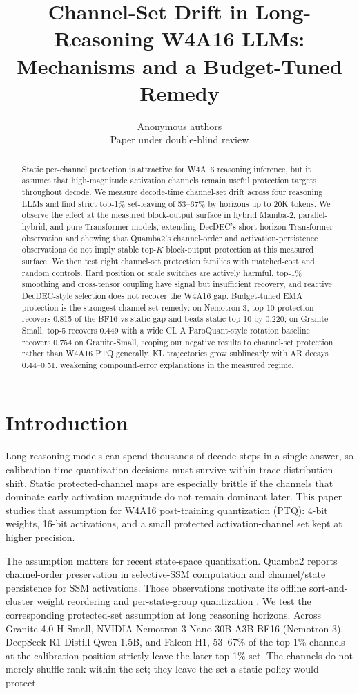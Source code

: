 \documentclass{article}
\title{Channel-Set Drift in Long-Reasoning W4A16 LLMs: Mechanisms and a Budget-Tuned Remedy}
\author{Anonymous authors\\Paper under double-blind review}
\begin{document}
\maketitle

\begin{abstract}
Static per-channel protection is attractive for W4A16 reasoning inference, but it assumes that high-magnitude activation channels remain useful protection targets throughout decode. We measure decode-time channel-set drift across four reasoning LLMs and find strict top-1\% set-leaving of 53--67\% by horizons up to 20K tokens. We observe the effect at the measured block-output surface in hybrid Mamba-2, parallel-hybrid, and pure-Transformer models, extending DecDEC's short-horizon Transformer observation and showing that Quamba2's channel-order and activation-persistence observations do not imply stable top-$K$ block-output protection at this measured surface. We then test eight channel-set protection families with matched-cost and random controls. Hard position or scale switches are actively harmful, top-1\% smoothing and cross-tensor coupling have signal but insufficient recovery, and reactive DecDEC-style selection does not recover the W4A16 gap. Budget-tuned EMA protection is the strongest channel-set remedy: on Nemotron-3, top-10 protection recovers 0.815 of the BF16-vs-static gap and beats static top-10 by 0.220; on Granite-Small, top-5 recovers 0.449 with a wide CI. A ParoQuant-style rotation baseline recovers 0.754 on Granite-Small, scoping our negative results to channel-set protection rather than W4A16 PTQ generally. KL trajectories grow sublinearly with AR decays 0.44--0.51, weakening compound-error explanations in the measured regime.
\end{abstract}

\section{Introduction}

Long-reasoning models can spend thousands of decode steps in a single answer, so calibration-time quantization decisions must survive within-trace distribution shift. Static protected-channel maps are especially brittle if the channels that dominate early activation magnitude do not remain dominant later. This paper studies that assumption for W4A16 post-training quantization (PTQ): 4-bit weights, 16-bit activations, and a small protected activation-channel set kept at higher precision.

The assumption matters for recent state-space quantization. Quamba2 reports channel-order preservation in selective-SSM computation and channel/state persistence for SSM activations. Those observations motivate its offline sort-and-cluster weight reordering and per-state-group quantization \citep{chiang2025quamba2}. We test the corresponding protected-set assumption at long reasoning horizons. Across Granite-4.0-H-Small, NVIDIA-Nemotron-3-Nano-30B-A3B-BF16 (Nemotron-3), DeepSeek-R1-Distill-Qwen-1.5B, and Falcon-H1, 53--67\% of the top-1\% channels at the calibration position strictly leave the later top-1\% set. The channels do not merely shuffle rank within the set; they leave the set a static policy would protect.
\end{document}
